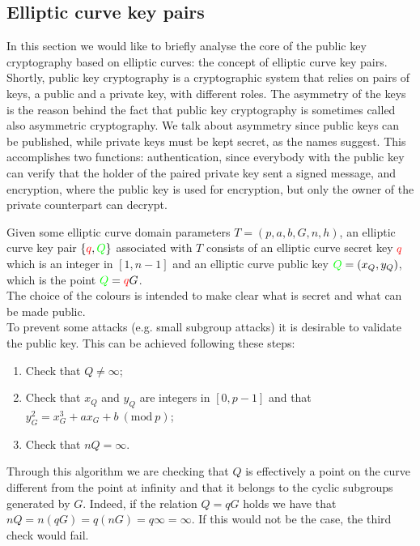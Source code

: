 \subsection{Elliptic curve key pairs}
In this section we would like to briefly analyse the core of the public key cryptography based on elliptic curves: the concept of elliptic curve key pairs. Shortly, public key cryptography is a cryptographic system that relies on pairs of keys, a public and a private key, with different roles. The asymmetry of the keys is the reason behind the fact that public key cryptography is sometimes called also asymmetric cryptography. We talk about asymmetry since public keys can be published, while private keys must be kept secret, as the names suggest. This accomplishes two functions: authentication, since everybody with the public key can verify that the holder of the paired private key sent a signed message, and encryption, where the public key is used for encryption, but only the owner of the private counterpart can decrypt.

\bigskip
\noindent
Given some elliptic curve domain parameters $T = (p, a, b, G, n, h)$, an elliptic curve key pair $\{\textcolor{red}{q}, \textcolor{green}{Q}\}$ associated with $T$ consists of an elliptic curve secret key $\textcolor{red}{q}$ which is an integer in $[1, n - 1]$ and an elliptic curve public key $\textcolor{green}{Q} = (x_Q, y_Q)$, which is the point $\textcolor{green}{Q} = \textcolor{red}{q}G$.
\\
The choice of the colours is intended to make clear what is secret and what can be made public.
\\
To prevent some attacks (e.g. small subgroup attacks) it is desirable to validate the public key. This can be achieved following these steps:
\begin{enumerate}
	\item Check that $Q \neq \infty$;
	\item Check that $x_Q$ and $y_Q$ are integers in $[0, p - 1]$ and that $y_G^2 = x_G^3 + ax_G + b \ (\text{mod} \ p)$;
	\item Check that $nQ = \infty$.
\end{enumerate}
Through this algorithm we are checking that $Q$ is effectively a point on the curve different from the point at infinity and that it belongs to the cyclic subgroups generated by $G$. Indeed, if the relation $Q = qG$ holds we have that $nQ = n(qG) = q(nG) = q\infty = \infty$. If this would not be the case, the third check would fail.

